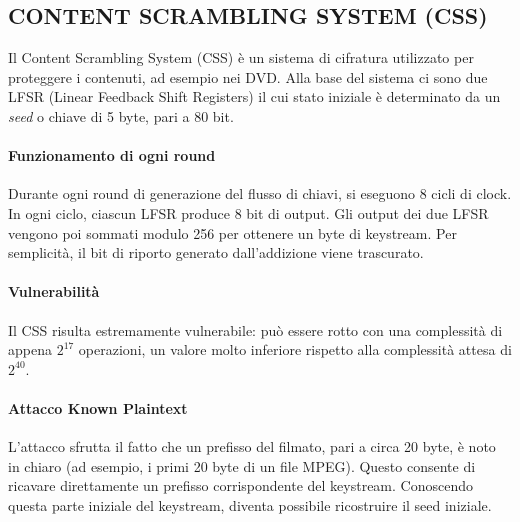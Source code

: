 \documentclass{report}
\begin{document}
\subsection{CONTENT SCRAMBLING SYSTEM (CSS)}

Il Content Scrambling System (CSS) è un sistema di cifratura utilizzato per proteggere i contenuti, ad esempio nei DVD. Alla base del sistema ci sono due LFSR (Linear Feedback Shift Registers) il cui stato iniziale è determinato da un \emph{seed} o chiave di 5 byte, pari a 80 bit.

\paragraph{Funzionamento di ogni round}
Durante ogni round di generazione del flusso di chiavi, si eseguono 8 cicli di clock. In ogni ciclo, ciascun LFSR produce 8 bit di output. Gli output dei due LFSR vengono poi sommati modulo 256 per ottenere un byte di keystream. Per semplicità, il bit di riporto generato dall'addizione viene trascurato.

\paragraph{Vulnerabilità}
Il CSS risulta estremamente vulnerabile: può essere rotto con una complessità di appena $2^{17}$ operazioni, un valore molto inferiore rispetto alla complessità attesa di $2^{40}$.

\paragraph{Attacco Known Plaintext}
L'attacco sfrutta il fatto che un prefisso del filmato, pari a circa 20 byte, è noto in chiaro (ad esempio, i primi 20 byte di un file MPEG). Questo consente di ricavare direttamente un prefisso corrispondente del keystream. Conoscendo questa parte iniziale del keystream, diventa possibile ricostruire il seed iniziale.
\end{document}
